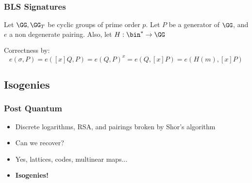 \documentclass{beamer}
\begin{document}
\begin{frame}
    \frametitle{BLS Signatures}
    Let $\GG, \GG_T$ be cyclic groups of prime order $p$. Let $P$ be a generator of $\GG$, and $e$ a non degenerate pairing.
    Also, let $H: \bin^* \to \GG$
    \begin{center}
    
    \begin{pcvstack}
        \begin{pchstack}
        
        \end{pchstack}

        
    \end{pcvstack}
    \end{center}
    
    Correctness by:
    \[ e(\sigma, P) = e([x]Q, P) = e(Q, P)^x = e(Q, [x]P) = e(H(m), [x]P) \]
 
\end{frame}

\subsection{Isogenies}
\begin{frame}
    \frametitle{Post Quantum}
    \begin{itemize}
        \item Discrete logarithms, RSA, and pairings broken by Shor's algorithm
        \item Can we recover?
        \item Yes, lattices, codes, multinear maps...
        \item \textbf{Isogenies!}
    \end{itemize}
\end{frame}
\end{document}
